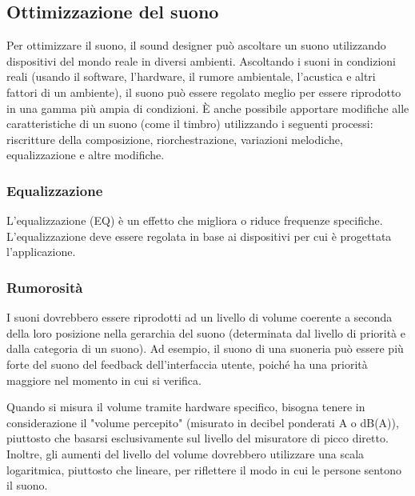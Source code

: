 \documentclass[12pt, a4paper]{report}
\begin{document}
                \subsection{Ottimizzazione del suono}
                Per ottimizzare il suono, il sound designer può ascoltare un suono utilizzando dispositivi del mondo reale in diversi ambienti. Ascoltando i suoni in condizioni reali (usando il software, l'hardware, il rumore ambientale, l'acustica e altri
                fattori di un ambiente), il suono può essere regolato meglio per essere riprodotto in una gamma più ampia di condizioni. È anche possibile apportare modifiche alle caratteristiche di un suono (come il timbro) utilizzando i seguenti processi:
                riscritture della composizione, riorchestrazione, variazioni melodiche, equalizzazione e altre modifiche.

                \subsubsection{Equalizzazione}
                L'equalizzazione (EQ) è un effetto che migliora o riduce frequenze specifiche. L'equalizzazione deve essere regolata in base ai dispositivi per cui è progettata l'applicazione.

                \subsubsection{Rumorosità}
                I suoni dovrebbero essere riprodotti ad un livello di volume coerente a seconda della loro posizione nella gerarchia del suono (determinata dal livello di priorità e dalla categoria di un suono). Ad esempio, il suono di una suoneria
                può essere più forte del suono del feedback dell'interfaccia utente, poiché ha una priorità maggiore nel momento in cui si verifica.

                Quando si misura il volume tramite hardware specifico, bisogna tenere in considerazione il "volume percepito" (misurato in decibel ponderati A o dB(A)), piuttosto che basarsi esclusivamente sul livello del misuratore di picco diretto.
                Inoltre, gli aumenti del livello del volume dovrebbero utilizzare una scala logaritmica, piuttosto che lineare, per riflettere il modo in cui le persone sentono il suono.
\end{document}

